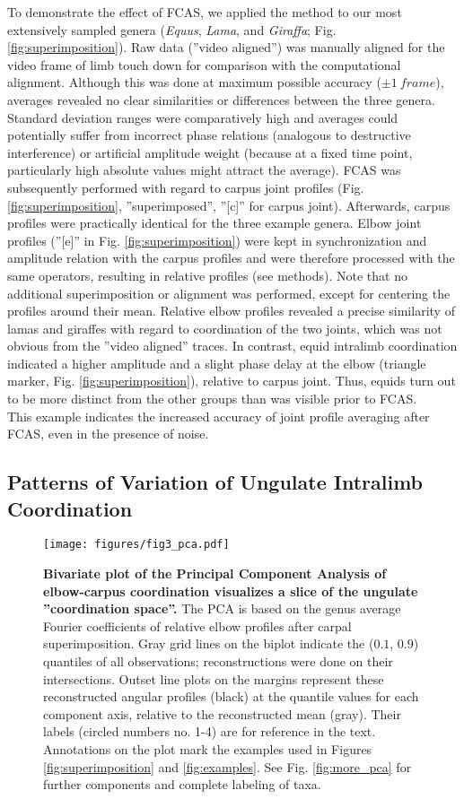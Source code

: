 To demonstrate the effect of FCAS, we applied the method to our most extensively sampled genera (\textit{Equus}, \textit{Lama}, and \textit{Giraffa}; Fig. \ref{fig:superimposition}).
Raw data (''video aligned'') was manually aligned for the video frame of limb touch down for comparison with the computational alignment.
Although this was done at maximum possible accuracy ($\pm 1\ frame$), averages revealed no clear similarities or differences between the three genera.
Standard deviation ranges were comparatively high and averages could potentially suffer from incorrect phase relations (analogous to destructive interference) or artificial amplitude weight (because at a fixed time point, particularly high absolute values might attract the average).
FCAS was subsequently performed with regard to carpus joint profiles (Fig. \ref{fig:superimposition}, ''superimposed'', ''[c]'' for carpus joint).
Afterwards, carpus profiles were practically identical for the three example genera.
Elbow joint profiles (''[e]'' in Fig. \ref{fig:superimposition}) were kept in synchronization and amplitude relation with the carpus profiles and were therefore processed with the same operators, resulting in relative profiles (see methods).
Note that no additional superimposition or alignment was performed, except for centering the profiles around their mean.
Relative elbow profiles revealed a precise similarity of lamas and giraffes with regard to coordination of the two joints, which was not obvious from the ''video aligned'' traces.
In contrast, equid intralimb coordination indicated a higher amplitude and a slight phase delay at the elbow (triangle marker, Fig. \ref{fig:superimposition}), relative to carpus joint.
Thus, equids turn out to be more distinct from the other groups than was visible prior to FCAS.
\\This example indicates the increased accuracy of joint profile averaging after FCAS, even in the presence of noise.

\subsection{Patterns of Variation of Ungulate Intralimb Coordination}

\begin{figure}[p]
\texttt{[image: figures/fig3\_pca.pdf]}
\caption{\textbf{Bivariate plot of the Principal Component Analysis of elbow-carpus coordination visualizes a slice of the ungulate ''coordination space''. }
The PCA is based on the genus average Fourier coefficients of relative elbow profiles after carpal superimposition.
Gray grid lines on the biplot indicate the ($0.1$, $0.9$) quantiles of all observations; reconstructions were done on their intersections.
Outset line plots on the margins represent these reconstructed angular profiles (black) at the quantile values for each component axis, relative to the reconstructed mean (gray).
Their labels (circled numbers no. 1-4) are for reference in the text.
Annotations on the plot mark the examples used in Figures \ref{fig:superimposition} and \ref*{fig:examples}.
See Fig. \ref*{fig:more_pca} for further components and complete labeling of taxa.
 }
\label{fig:pca}
\end{figure}


